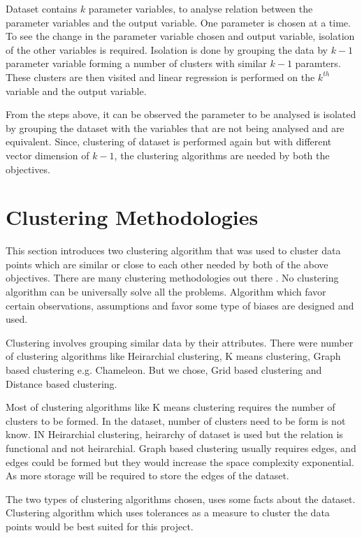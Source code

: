 Dataset contains \(k\) parameter variables, to analyse relation between the parameter variables and the output variable. One parameter is chosen at a time. To see the change in the parameter variable chosen and output variable, isolation of the other variables is required. Isolation is done by grouping the data by \(k-1\) parameter variable forming a number of clusters with similar \(k-1\) paramters. These clusters are then visited and linear regression is performed on the \(k^{th}\) variable and the output variable. 

From the steps above, it can be observed the parameter to be analysed is isolated by grouping the dataset with the variables that are not being analysed and are equivalent. Since, clustering of dataset is performed again but with different vector dimension of \(k-1\), the clustering algorithms are needed by both the objectives.

\section{Clustering Methodologies}

This section introduces two clustering algorithm that was used to cluster data points which are similar or close to each other needed by both of the above objectives. There are many clustering methodologies out there \cite{xu2005survey}. No clustering algorithm can be universally solve all the problems. Algorithm which favor certain observations, assumptions and favor some type of biases are designed and used. 

Clustering involves grouping similar data by their attributes. There were number of clustering algorithms like Heirarchial clustering, K means clustering, Graph based clustering e.g. Chameleon. But we chose, Grid based clustering and Distance based clustering.

Most of clustering algorithms like K means clustering requires the number of clusters to be formed. In the dataset, number of clusters need to be form is not know. IN Heirarchial clustering, heirarchy of dataset is used but the relation is functional and not heirarchial. Graph based clustering usually requires edges, and edges could be formed but they would increase the space complexity exponential. As more storage will be required to store the edges of the dataset.

The two types of clustering algorithms chosen, uses some facts about the dataset. Clustering algorithm which uses tolerances as a measure to cluster the data points would be best suited for this project.

